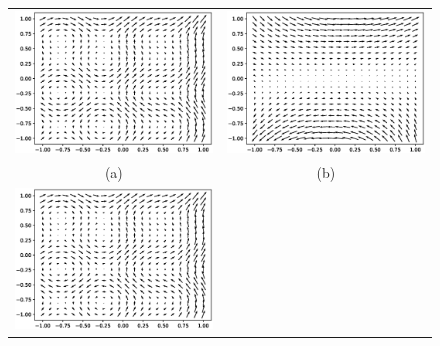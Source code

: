 \begin{figure}[ht]
		\begin{center}
			\begin{tabular}{cc}
				\includegraphics[scale=.40]{first_div_field.eps}&
				\includegraphics[scale=.40]{second_div_field.eps} \\
				(a) & (b)\\
				\includegraphics[scale=.40]{first_div_field.eps}&

\end{tabular}
\end{center}
\end{figure}
